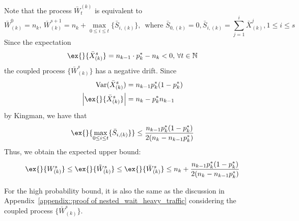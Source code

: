 Note that  the process $\bar{W}_t^{(k)}$ is equivalent to 
$$ \bar{W}_{(k)}^0 = n_k,\, \bar{W}_{(k)}^{s+1} = n_k + \max_{0\leq i\leq t}\{ \bar{S}_{i,(k)} \} ,\, \text{ where }\bar{S}_{0,(k)}=0, \bar{S}_{i,(k)} = \sum_{j=1}^i \bar{X}_{(k)}^{j}, 1\leq i\leq s $$
Since the expectation
$$ \ex{}{\bar{X}_{(k)}^s} = n_{k-1}\cdot p_{k}^* - n_k <0,\, \forall t\in \mathbb{N} $$
the coupled process $\{\bar{W}_{(k)}^s \}$ has a negative drift. Since 
\begin{align*}
\text{Var}(\bar{X}_{(k)}^s)& = n_{k-1}p_k^*(1-p_k^*)\\
\left|\ex{}{\bar{X}_{(k)}^s}\right|&=n_k - p_k^* n_{k-1}
\end{align*}
by Kingman, we have that
$$\ex{}{\max_{0\leq i\leq t}\{ \bar{S}_{i,(k)} \}  }\leq  \frac{  n_{k-1}p_k^*(1-p_k^*) }{ 2(n_k - n_{k-1}p_k^*)} $$
Thus, we obtain the expected upper bound:
$$\ex{}{W_{(k)}^s}\leq \ex{}{\tilde{W}_{(k)}^s}\leq \ex{}{\bar{W}_{(k)}^s} \leq n_k + \frac{  n_{k-1}p_k^*(1-p_k^*) }{ 2(n_k - n_{k-1}p_k^*)}$$

For the high probability bound, it is also the same as the discussion in Appendix~\ref{appendix::proof of nested_wait_heavy_traffic} considering the coupled process $\{ \bar{W}_{(k)}^s \}$. 


